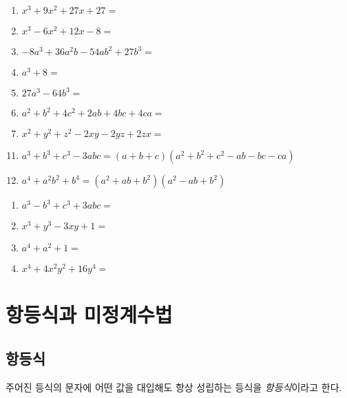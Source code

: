 \documentclass{oblivoir}
\begin{document}
%
\begin{enumerate}\label{fact02}
\item
\(x^3+9x^2+27x+27=\)
\item
\(x^3-6x^2+12x-8=\)
\item
\(-8a^3+36a^2b-54ab^2+27b^3=\)
\item
\(a^3+8=\)
\item
\(27a^3-64b^3=\)
\item
\(a^2+b^2+4c^2+2ab+4bc+4ca=\)
\item
\(x^2+y^2+z^2-2xy-2yz+2zx=\)
\end{enumerate}

\newpage
%
\begin{mdframed}
\begin{enumerate}
\setcounter{enumi}{10}
\item\label{mult_11}
\(a^3+b^3+c^3-3abc=(a+b+c)(a^2+b^2+c^2-ab-bc-ca)\)
\item\label{mult_12}
\(a^4+a^2b^2+b^4=(a^2+ab+b^2)(a^2-ab+b^2)\)
\end{enumerate}
\end{mdframed}

%
\begin{enumerate}\label{fact03}
\item
\(a^3-b^3+c^3+3abc=\)
\item
\(x^3+y^3-3xy+1=\)
\item
\(a^4+a^2+1=\)
\item
\(x^4+4x^2y^2+16y^4=\)
\end{enumerate}

\section{항등식과 미정계수법}

\subsection{항등식}
\begin{mdframed}
%
주어진 등식의 문자에 어떤 값을 대입해도 항상 성립하는 등식을 \emph{항등식}이라고 한다.
\end{mdframed}
\end{document}
